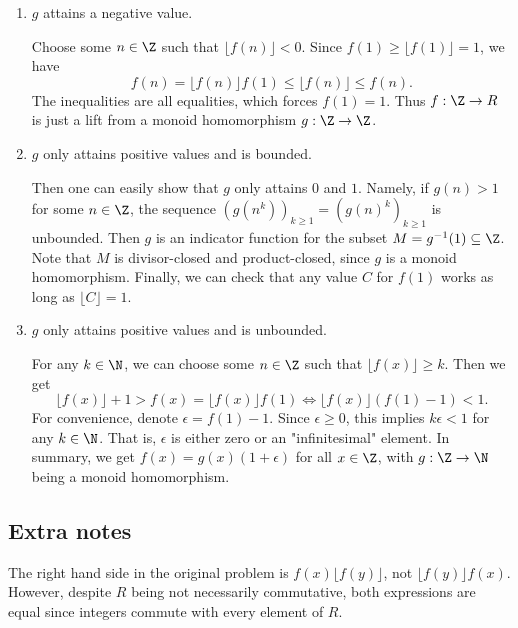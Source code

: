 \begin{enumerate}

    \item 
    $g$ attains a negative value.

    Choose some $n \in \Z$ such that $\lfloor f(n) \rfloor < 0$.
    Since $f(1) \geq \lfloor f(1) \rfloor = 1$, we have
    \[ f(n) = \lfloor f(n) \rfloor f(1) \leq \lfloor f(n) \rfloor \leq f(n). \]
    The inequalities are all equalities, which forces $f(1) = 1$.
    Thus $f : \Z \to R$ is just a lift from a monoid homomorphism $g : \Z \to \Z$.

    \item
    $g$ only attains positive values and is bounded.

    Then one can easily show that $g$ only attains $0$ and $1$.
    Namely, if $g(n) > 1$ for some $n \in \Z$, the sequence $(g(n^k))_{k \geq 1} = (g(n)^k)_{k \geq 1}$ is unbounded.
    Then $g$ is an indicator function for the subset $M = g^{-1}(1) \subseteq \Z$.
    Note that $M$ is divisor-closed and product-closed, since $g$ is a monoid homomorphism.
    Finally, we can check that any value $C$ for $f(1)$ works as long as $\lfloor C \rfloor = 1$.

    \item
    $g$ only attains positive values and is unbounded.

    For any $k \in \N$, we can choose some $n \in \Z$ such that $\lfloor f(x) \rfloor \geq k$.
    Then we get
    \[ \lfloor f(x) \rfloor + 1 > f(x) = \lfloor f(x) \rfloor f(1) \iff \lfloor f(x) \rfloor (f(1) - 1) < 1. \]
    For convenience, denote $\epsilon = f(1) - 1$.
    Since $\epsilon \geq 0$, this implies $k \epsilon < 1$ for any $k \in \N$.
    That is, $\epsilon$ is either zero or an "infinitesimal" element.
    In summary, we get $f(x) = g(x) (1 + \epsilon)$ for all $x \in \Z$, with $g : \Z \to \N$ being a monoid homomorphism.

\end{enumerate}



\subsection*{Extra notes}

The right hand side in the original problem is $f(x) \lfloor f(y) \rfloor$, not $\lfloor f(y) \rfloor f(x)$.
However, despite $R$ being not necessarily commutative, both expressions are equal since integers commute with every element of $R$.
